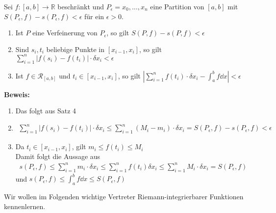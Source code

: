 \begin{Satz}{
	Sei $f:[a,b] \rightarrow \mathbb{R}$ beschränkt und $P_{\epsilon} = 
	{x_0, \hdots, x_n}$ eine Partition von $[a,b]$ mit $S(P_{\epsilon},f) -
	s(P_{\epsilon},f) < \epsilon$ für ein $\epsilon > 0$.
	\begin{enumerate}
		\item Ist $P$ eine Verfeinerung von $P_{\epsilon}$, so gilt 
		$S(P,f) - s(P,f) < \epsilon$
		\item Sind $s_i, t_i$ beliebige Punkte in $[x_{i-1},x_i]$, so gilt 
		$\sum_{i=1}^n \left\vert f(s_i) - f(t_i) \right\vert \cdot \delta x_i 
		< \epsilon$
		\item Ist $f \in \mathcal{R}_{[a,b]}$ und $t_i \in [x_{i-1},x_i]$, so 
		gilt 
		$\left\vert \sum_{i=1}^n f(t_i) \cdot \delta x_i - \int_a^b f \dd{x} 
		\right\vert < \epsilon$ 
	\end{enumerate}	 
	\textbf{Beweis:}
	\begin{enumerate}
		\item Das folgt aus Satz 4 %
		
		\item
		 \begin{align*}
			\sum_{i = 1}^n \left\vert f(s_i) - f(t_i) \right\vert	\cdot 
			\delta x_i \leq \sum_{i=1}^n (M_i-m_i)\cdot \delta x_i
			= S(P_{\epsilon},f) - s(P_{\epsilon},f) < \epsilon
		 \end{align*}
		 \item Da $t_i \in [x_{i-1},x_i]$, gilt $m_i \leq f(t_i) \leq M_i$ \\
		 	Damit folgt die Aussage aus
			 \begin{align*}
			 	s(P_{\epsilon},f ) \leq  
			 	\sum_{i = 1}^n m_i \cdot \delta x_i \leq \sum_{i=1}^n f(t_i) \delta 
			 	x_i \leq \sum_{i=1}^n M_i \cdot \delta x_i = S(P_{\epsilon},f)
			 \end{align*}
			 und $s(P_{\epsilon},f) \leq \int_a^b f \dd{x} \leq S(P_{\epsilon},f)$
	\end{enumerate}
	Wir wollen im Folgenden wichtige Vertreter Riemann-integrierbarer 
	Funktionen kennenlernen.
}\end{Satz}

